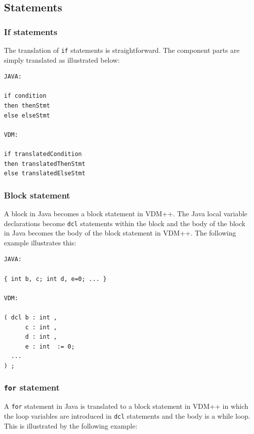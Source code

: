 \documentclass[\pformat,12pt]{article}
\begin{document}
\subsection{Statements}

\subsubsection{If statements}

The translation of \texttt{if} statements is straightforward. The
component parts are simply translated as illustrated below:

\begin{small}
\begin{verbatim}
JAVA:

if condition
then thenStmt
else elseStmt

VDM:

if translatedCondition
then translatedThenStmt
else translatedElseStmt
\end{verbatim}
\end{small}

\subsubsection{Block statement}

A block in Java becomes a block statement in VDM++. The Java local
variable declarations become \texttt{dcl} statements within the block
and the body of the block in Java becomes the body of the block
statement in VDM++. The following example illustrates this:

\begin{small}
\begin{verbatim}
JAVA:

{ int b, c; int d, e=0; ... }

VDM:

( dcl b : int ,
      c : int ,
      d : int ,
      e : int  := 0;
  ...
) ;
\end{verbatim}
\end{small}

\subsubsection{\texttt{for} statement}

A \texttt{for} statement in Java is translated to a block statement in
VDM++ in which the loop variables are introduced in \texttt{dcl}
statements and the body is a while loop. This is illustrated by the
following example: 
\end{document}
